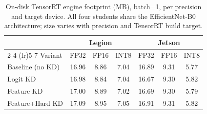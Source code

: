 \begin{table}[t]
\centering
\caption{On-disk TensorRT engine footprint (MB), batch=1, per precision and target device. All four students share the EfficientNet-B0 architecture; size varies with precision and TensorRT build target.}
\label{tab:complexity_engines}
\begin{tabular}{lcccccc}
\toprule
 & \multicolumn{3}{c}{Legion} & \multicolumn{3}{c}{Jetson} \\
\cmidrule(lr){2-4} \cmidrule(lr){5-7}
Variant & FP32 & FP16 & INT8 & FP32 & FP16 & INT8 \\
\midrule
Baseline (no KD) & 16.96 & 8.86 & 7.04 & 16.89 & 9.31 & 5.77 \\
Logit KD & 16.98 & 8.84 & 7.04 & 16.67 & 9.30 & 5.82 \\
Feature KD & 17.00 & 8.89 & 7.02 & 16.69 & 9.30 & 5.79 \\
Feature+Hard KD & 17.09 & 8.95 & 7.05 & 16.91 & 9.31 & 5.82 \\
\bottomrule
\end{tabular}
\end{table}
